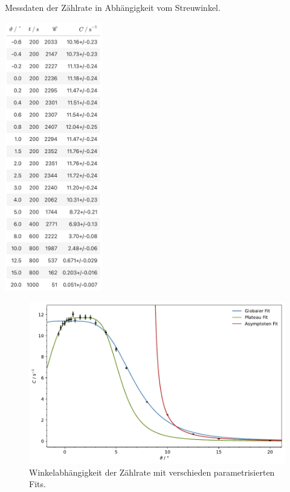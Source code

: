 \begin{table}[H]
    \centering
    \caption{Messdaten der Zählrate in Abhängigkeit vom Streuwinkel.}
    \includegraphics[width=0.32\textwidth]{content/tabelle/Streuwinkel.jpg}
    \label{tab:Streuwinkel}
\end{table}

\begin{figure}[H]
    \centering
    \includegraphics[width=\textwidth]{content/messung/Streuwinkel.pdf}
    \caption{Winkelabhängigkeit der Zählrate mit verschieden parametrisierten Fits.}
    \label{fig:Streuwinkel}
\end{figure}

